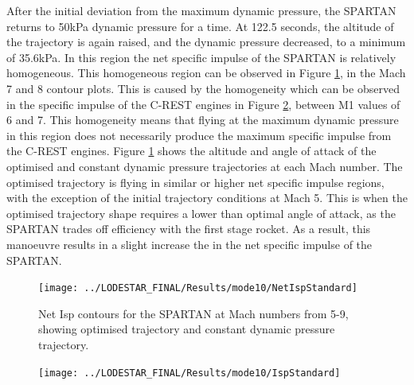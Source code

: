 After the initial deviation from the maximum dynamic pressure, the SPARTAN returns to 50kPa dynamic pressure for a time. 
At 122.5 seconds, the altitude of the trajectory is again raised, and the dynamic pressure decreased, to a minimum of 35.6kPa. In this region the net specific impulse of the SPARTAN is relatively homogeneous. This homogeneous region can be observed in Figure \ref{fig:NetIspStandardNoReturn}, in the Mach 7 and 8 contour plots. This is caused by the homogeneity which can be observed in the specific impulse of the C-REST engines in Figure \ref{fig:IspStandard}, between M1 values of 6 and 7. This homogeneity means that flying at the maximum dynamic pressure in this region does not necessarily produce the maximum specific impulse from the C-REST engines. Figure \ref{fig:NetIspStandardNoReturn} shows the altitude and angle of attack of the optimised and constant dynamic pressure trajectories at each Mach number. The optimised trajectory is flying in similar or higher net specific impulse regions, with the exception of the initial trajectory conditions at Mach 5. This is when the optimised trajectory shape requires a lower than optimal angle of attack, as the SPARTAN trades off efficiency with the first stage rocket. As a result, this manoeuvre results in a slight increase the in the net specific impulse of the SPARTAN.




\begin{figure}[ht!]
	\centering
	\texttt{[image: ../LODESTAR\_FINAL/Results/mode10/NetIspStandard]}
	\caption{Net Isp contours for the SPARTAN at Mach numbers from 5-9, showing optimised trajectory and constant dynamic pressure trajectory.}
	\label{fig:NetIspStandardNoReturn}
\end{figure}

\begin{figure}[ht!]
	\centering
	\texttt{[image: ../LODESTAR\_FINAL/Results/mode10/IspStandard]}
	\caption{}
	\label{fig:IspStandard}
\end{figure}


